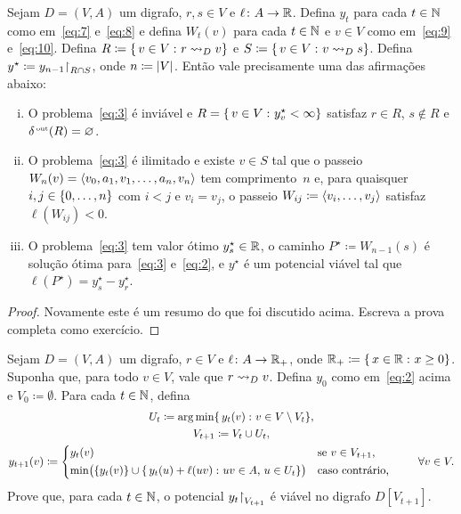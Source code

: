 \documentclass[10pt,reqno]{amsart}
\begin{document}
\begin{theorem}
  Sejam \(D = (V,A)\) um digrafo, \(r,s \in V\) e
  \(\ell \colon A \to \mathbb{R}\).  Defina \(y_t\) para cada
  \(t \in \mathbb{N}\) como em~\eqref{eq:7} e~\eqref{eq:8} e defina
  \(W_t(v)\) para cada \(t \in \mathbb{N}\) e \(v \in V\) como
  em~\eqref{eq:9} e~\eqref{eq:10}.  Defina
  \(R \coloneqq \{\,{v \in V}\,\colon{r \rightsquigarrow_D v}\}\) e
  \(S \coloneqq \{\,{v \in V}\,\colon{v \rightsquigarrow_D s}\}\).  Defina
  \(y^{\star} \coloneqq y_{n-1}\mathord{\restriction}_{R \cap S}\), onde
  \(n \coloneqq \lvert V\rvert\).  Então vale precisamente uma das
  afirmações abaixo:
  \begin{enumerate}[(i)]
  \item O problema~\eqref{eq:3} é inviável e
    \(R = \{\,{v \in V}\,\colon{y_v^{\star} < \infty}\}\) satisfaz \(r \in R\),
    \(s \not\in R\) e \(\delta_{}^{\scriptscriptstyle \rm\, out}(R) = \varnothing\).
  \item O problema~\eqref{eq:3} é ilimitado e existe \(v \in S\) tal
    que o passeio \(W_n(v) = \langle v_0,a_1,v_1,\dotsc,a_n,v_n\rangle\) tem
    comprimento~\(n\) e, para quaisquer \(i,j \in \{0,\dotsc,n\}\)
    com \(i < j\) e \(v_i = v_j\), o passeio
    \(W_{ij} \coloneqq \langle v_i,\dotsc,v_j\rangle\) satisfaz
    \(\ell(W_{ij}) < 0\).
  \item O problema~\eqref{eq:3} tem valor ótimo
    \(y_s^{\star} \in \mathbb{R}\), o caminho
    \(P^{\star} \coloneqq W_{n-1}(s)\) é solução ótima
    para~\eqref{eq:3} e~\eqref{eq:2}, e \(y^{\star}\) é um potencial
    viável tal que \(\ell(P^{\star}) = y_s^{\star} - y_r^{\star}\).
  \end{enumerate}
\end{theorem}
\begin{proof}
  Novamente este é um resumo do que foi discutido acima.  Escreva a
  prova completa como exercício.
\end{proof}

\begin{exercise}
  Sejam \(D = (V,A)\) um digrafo, \(r \in V\) e
  \(\ell \colon A \to \mathbb{R}_+\), onde
  \(\mathbb{R}_+ \coloneqq \{\,{x \in \mathbb{R}}\,\colon{x \geq 0}\}\).  Suponha que,
  para todo \(v \in V\), vale que \(r \rightsquigarrow_D v\).  Defina \(y_0\)
  como em~\eqref{eq:2} acima e \(V_0 \coloneqq \emptyset\).  Para cada
  \(t \in \mathbb{N}\), defina
  \begin{gather*}
    U_t
    \coloneqq
    \argmin\setst{y_t(v)}{v \in V \setminus V_t},
    \\
    V_{t+1}
    \coloneqq
    V_t \cup U_t,
    \\
    y_{t+1}(v)
    \coloneqq
    \begin{cases*}
      y_t(v)
      &
      se \(v \in V_{t+1}\),
      \\
      \min\paren[\big]{
        \set{y_t(v)}
        \cup
        \setst{y_t(u) + \ell(uv)}{uv \in A,\, u \in U_t}
      }
      &
      caso contrário,
    \end{cases*}
    \qquad
    \forall v \in V.
  \end{gather*}
  Prove que, para cada \(t \in \mathbb{N}\), o potencial
  \(y_t\mathord{\restriction}_{V_{t+1}}\) é viável no digrafo \(D[V_{t+1}]\).
\end{exercise}
\end{document}
